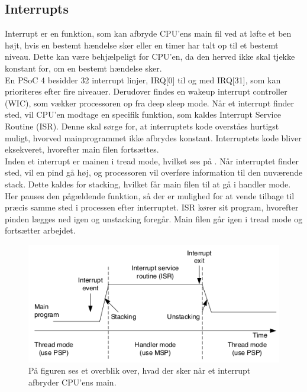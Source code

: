\subsection{Interrupts}
Interrupt er en funktion, som kan afbryde CPU'ens main fil ved at løfte et ben højt, hvis en bestemt hændelse sker eller en timer har talt op til et bestemt niveau. Dette kan være behjælpeligt for CPU'en, da den herved ikke skal tjekke konstant for, om en bestemt hændelse sker. \citep{Badiger2016} \\
En PSoC 4 besidder 32 interrupt linjer, IRQ[0] til og med IRQ[31], som kan prioriteres efter fire niveauer. Derudover findes en wakeup interrupt controller (WIC), som vækker processoren op fra deep sleep mode. Når et interrupt finder sted, vil CPU'en modtage en specifik funktion, som kaldes Interrupt Service Routine (ISR). Denne skal sørge for, at interruptets kode overståes hurtigst muligt, hvorved mainprogrammet ikke afbrydes konstant. Interruptets kode bliver eksekveret, hvorefter main filen fortsættes. \citep{Badiger2016}\\
Inden et interrupt er mainen i tread mode, hvilket ses på . Når interruptet finder sted, vil en pind gå høj, og processoren vil overføre information til den nuværende stack. Dette kaldes for stacking, hvilket får main filen til at gå i handler mode. Her pauses den pågældende funktion, så der er mulighed for at vende tilbage til præcis samme sted i processen efter interruptet. ISR kører sit program, hvorefter pinden lægges ned igen og unstacking foregår. Main filen går igen i tread mode og fortsætter arbejdet. \citep{Badiger2016,Tanenbaum2006}
\begin{figure}[H]
	\centering
	\includegraphics[scale=0.68]{figures/bProblemloesning/interrupt.png}
	\caption{På figuren ses et overblik over, hvad der sker når et interrupt afbryder CPU'ens main. \citep{Tanenbaum2006}}
	\label{fig:interrupt}
\end{figure}\vspace{-0.5cm}
